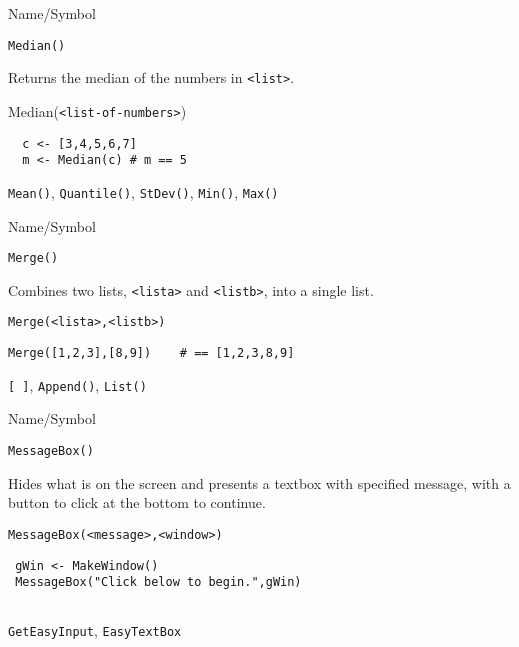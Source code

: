 \begin{desc}{Name/Symbol}
\item[Name/Symbol]	\verb+Median()+

\item[Description]	Returns the median of the numbers in
  \verb+<list>+.  

\item[Usage]	Median(\verb+<list-of-numbers>+)

\item[Example]	
\begin{verbatim} 
  c <- [3,4,5,6,7]
  m <- Median(c) # m == 5
\end{verbatim}
\item[See Also]	\verb+Mean()+, \verb+Quantile()+, \verb+StDev()+, \verb+Min()+, \verb+Max()+
\end{desc}

\begin{desc}{Name/Symbol}
\item[Name/Symbol]	\verb+Merge()+

\item[Description]	Combines two lists, \verb+<lista>+ and \verb+<listb>+, into a single list.

\item[Usage]		
\begin{verbatim}
Merge(<lista>,<listb>)
\end{verbatim}

\item[Example]	
\begin{verbatim}
Merge([1,2,3],[8,9]) 	# == [1,2,3,8,9]
\end{verbatim}

\item[See Also]	\verb+[ ]+, \verb+Append()+, \verb+List()+
\end{desc}


\begin{desc}{Name/Symbol}
\item[Name/Symbol]	\verb+MessageBox()+

\item[Description]	Hides what is on the screen and presents a textbox with
  specified message, with a button to click at the bottom to continue.


\item[Usage]		
\begin{verbatim}
MessageBox(<message>,<window>)
\end{verbatim}

\item[Example]	
\begin{verbatim}
 gWin <- MakeWindow()
 MessageBox("Click below to begin.",gWin)


\end{verbatim}

\item[See Also]	\verb+GetEasyInput+, \verb+EasyTextBox+
\end{desc}



